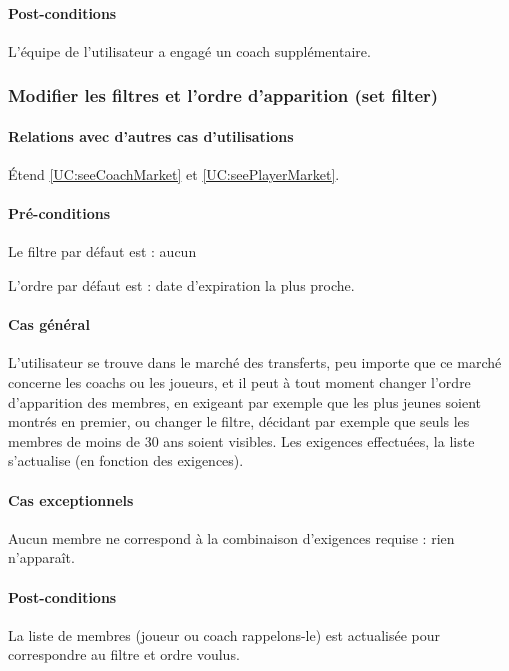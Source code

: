 \paragraph{Post-conditions}
\begin{list}{}{\leftmargin=1.5em}
\item{L'équipe de l'utilisateur a engagé un coach supplémentaire.}
\end{list}

\subsubsection{Modifier les filtres et l'ordre d'apparition (set filter)}
\label{UC:setFilter}
\paragraph{Relations avec d'autres cas d'utilisations}
Étend \ref{UC:seeCoachMarket} et \ref{UC:seePlayerMarket}.
\paragraph{Pré-conditions}
\begin{list}{}{\leftmargin=1.5em}
\item{Le filtre par défaut est : aucun}
\item{L'ordre par défaut est : date d'expiration la plus proche.}
\end{list}
\paragraph{Cas général}
L'utilisateur se trouve dans le marché des transferts, peu importe que ce marché concerne les coachs ou les joueurs, et il peut à tout moment changer l'ordre d'apparition des membres, en exigeant par exemple que les plus jeunes soient montrés en premier, ou changer le filtre, décidant par exemple que seuls les membres de moins de 30 ans soient visibles. Les exigences effectuées, la liste s'actualise (en fonction des exigences). 
\paragraph{Cas exceptionnels}
Aucun membre ne correspond à la combinaison d'exigences requise : rien n'apparaît. 
\paragraph{Post-conditions}
\begin{list}{}{\leftmargin=1.5em}
\item{La liste de membres (joueur ou coach rappelons-le) est actualisée pour correspondre au filtre et ordre voulus.}
\end{list}

